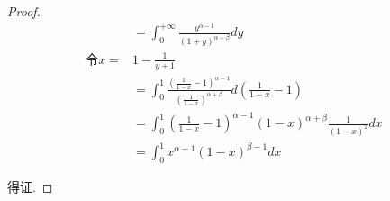 \documentclass{article}
\begin{document}
\begin{enumerate}
\begin{enumerate}
\begin{proof}
\begin{equation}
\begin{aligned}
                    &=\int_{0}^{+\infty}\frac{y^{\alpha-1}}{(1+y)^{\alpha+\beta}}dy \\
                    \text{令} x=&1-\frac{1}{y+1} \\
                    &=\int_{0}^{1}\frac{(\frac{1}{1-x}-1)^{\alpha-1}}{(\frac{1}{1-x})^{\alpha+\beta}}d(\frac{1}{1-x}-1) \\
                    &=\int_{0}^{1}(\frac{1}{1-x}-1)^{\alpha-1}(1-x)^{\alpha+\beta}\frac{1}{(1-x)^2}dx \\
                    &=\int_{0}^{1}x^{\alpha-1}(1-x)^{\beta-1}dx
                \end{aligned}
                \nonumber
            \end{equation} \par
            得证.
        \end{proof}
    \end{enumerate}
\end{enumerate}
\end{document}
